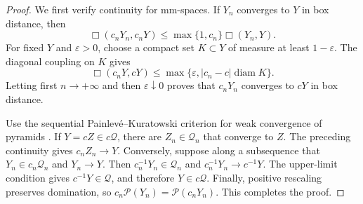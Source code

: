 \documentclass{amsart}
\numberwithin{equation}{section}
\theoremstyle{plain}
\theoremstyle{definition}
\theoremstyle{remark}
\newcommand{\Pyr}{\mathcal{P}}
\newcommand{\eps}{\varepsilon}
\DeclareMathOperator{\diam}{diam}
\begin{document}
\begin{proof}
	We first verify continuity for mm-spaces.  If $Y_n$ converges to $Y$ in
	box distance, then
\[ \Box(c_nY_n,c_nY) \le \max\{1,c_n\}\Box(Y_n,Y). \]
	For fixed $Y$ and $\eps>0$, choose a compact set $K\subset Y$ of measure
	at least $1-\eps$.  The diagonal coupling on $K$ gives
\[ \Box(c_nY,cY) \le \max\{\eps,|c_n-c|\diam K\}. \]
	Letting first $n\to+\infty$ and then $\eps\downarrow0$ proves that
	$c_nY_n$ converges to $cY$ in box distance.

	Use the sequential Painlev\'e--Kuratowski criterion for weak convergence
	of pyramids
	\cite[Definition~6.4 and Proposition~6.9]{shioya2016mmg}.  If
	$Y=cZ\in c\mathcal Q$, there are $Z_n\in\mathcal Q_n$ that converge to
	$Z$.  The preceding continuity gives $c_nZ_n\to Y$.  Conversely, suppose
	along a subsequence that $Y_n\in c_n\mathcal Q_n$ and $Y_n\to Y$.  Then
	$c_n^{-1}Y_n\in\mathcal Q_n$ and
	$c_n^{-1}Y_n\to c^{-1}Y$.  The upper-limit condition gives
	$c^{-1}Y\in\mathcal Q$, and therefore $Y\in c\mathcal Q$.  Finally,
	positive rescaling preserves domination, so
	$c_n\Pyr(Y_n)=\Pyr(c_nY_n)$.  This completes the proof.
\end{proof}
\end{document}
